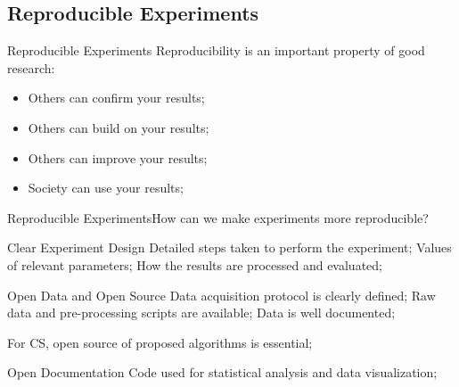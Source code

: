 \subsection{Reproducible Experiments}
\begin{frame}{Reproducible Experiments}
  Reproducibility is an important property of good research:
  \bigskip

  \begin{itemize}
    \item Others can confirm your results;
      \medskip
    \item Others can build on your results;
      \medskip
    \item Others can improve your results;
      \medskip
    \item Society can use your results;
  \end{itemize}
\end{frame}

\begin{frame}{Reproducible Experiments}{How can we make experiments more reproducible?}
  \begin{exampleblock}{Clear Experiment Design}
    Detailed steps taken to perform the experiment; Values of relevant parameters; How the results are processed and evaluated;
  \end{exampleblock}
  \begin{exampleblock}{Open Data and Open Source}
    Data acquisition protocol is clearly defined; Raw data and pre-processing scripts are available; Data is well documented;\bigskip

    For CS, open source of proposed algorithms is essential;
  \end{exampleblock}
  \begin{exampleblock}{Open Documentation}
    Code used for statistical analysis and data visualization;
  \end{exampleblock}
\end{frame}
